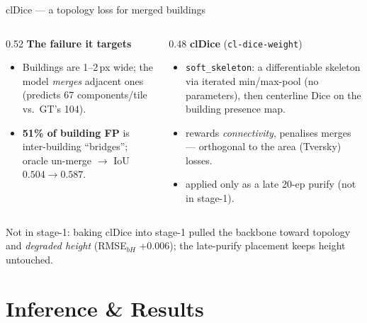 \documentclass[aspectratio=169,11pt]{beamer}
\newcommand{\code}[1]{\texttt{\small #1}}
\begin{document}
\begin{frame}{clDice --- a topology loss for merged buildings}
  \begin{columns}[T]
    \begin{column}{0.52\textwidth}
      \textbf{The failure it targets}
      \begin{itemize}\small
        \item Buildings are 1--2\,px wide; the model \emph{merges} adjacent ones
          (predicts 67 components/tile vs.\ GT's 104).
        \item \textbf{51\% of building FP} is inter-building ``bridges'';
          oracle un-merge $\to$ IoU $0.504\!\to\!0.587$.
      \end{itemize}
    \end{column}
    \begin{column}{0.48\textwidth}
      \textbf{clDice} (\code{cl-dice-weight})
      \begin{itemize}\small
        \item \code{soft\_skeleton}: a differentiable skeleton via iterated
          min/max-pool (no parameters), then centerline Dice on the building
          presence map.
        \item rewards \emph{connectivity}, penalises merges --- orthogonal to the
          area (Tversky) losses.
        \item applied only as a late 20-ep purify (not in stage-1).
      \end{itemize}
    \end{column}
  \end{columns}
  \vspace{0.3em}
  {\footnotesize \textcolor{cToken}{Not in stage-1:} baking clDice into stage-1 pulled
   the backbone toward topology and \emph{degraded height} (RMSE$_{bH}$ +0.006); the
   late-purify placement keeps height untouched.}
\end{frame}

\section{Inference \& Results}
\end{document}
